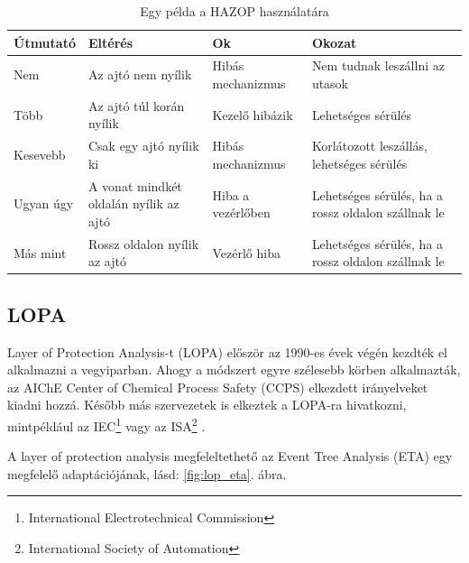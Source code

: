 \begin{table}[!ht]
    \footnotesize
    \begin{tabular}{|l p{25mm} p{25mm} p{25mm}|}
        \toprule
        Útmutató & Eltérés & Ok & Okozat \\
        \midrule
        Nem & Az ajtó nem nyílik & Hibás mechanizmus & Nem tudnak leszállni az utasok \\
        \midrule
        Több & Az ajtó túl korán nyílik & Kezelő hibázik & Lehetséges sérülés \\ 
        \midrule
        Kesevebb & Csak egy ajtó nyílik ki & Hibás mechanizmus & Korlátozott leszállás, lehetséges sérülés\\ 
        \midrule
        Ugyan úgy & A vonat mindkét oldalán nyílik az ajtó & Hiba a vezérlőben & Lehetséges sérülés, ha a rossz oldalon szállnak le\\ 
        \midrule
        Más mint & Rossz oldalon nyílik az ajtó & Vezérlő hiba & Lehetséges sérülés, ha a rossz oldalon szállnak le \\
        \bottomrule
    \end{tabular}
    \caption{Egy példa a HAZOP használatára}
    \label{tab:hazop}
\end{table}

\subsection{LOPA}
Layer of Protection Analysis-t (LOPA) először az 1990-es évek végén kezdték el alkalmazni a vegyiparban.
Ahogy a módszert egyre szélesebb körben alkalmazták, az AIChE Center of Chemical Process Safety (CCPS) elkezdett irányelveket kiadni hozzá.
Később más szervezetek is elkeztek a LOPA-ra hivatkozni, mintpéldául az IEC\footnote{International Electrotechnical Commission} vagy az ISA\footnote{International Society of Automation} \cite{WILLEY201412}.

A layer of protection analysis megfeleltethető az Event Tree Analysis (ETA) egy megfelelő adaptációjának\cite{HRRS}, lásd: \ref{fig:lop_eta}. ábra.

